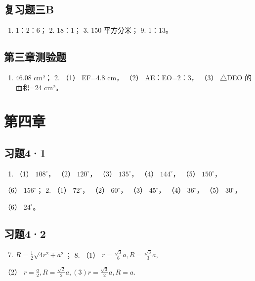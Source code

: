 \subsection{复习题三B}

\begin{enumerate}
\item
  1：2：6； 2. 18：1； 3. 150 平方分米； 9. 1：13。
\end{enumerate}

\subsection{第三章测验题}

\begin{enumerate}
\item
  46.08 cm²； 2. （1） EF=4.8 cm， （2） AE：EO=2：3， （3） △DEO
  的面积=24 cm²。
\end{enumerate}

\section{第四章}

\subsection{习题4·1}

\begin{enumerate}
\item
  （1） \(108^{\circ}\)， （2） \(120^{\circ}\)， （3）
  \(135^{\circ}\)， （4） \(144^{\circ}\)， （5） \(150^{\circ}\)，
\end{enumerate}

（6） \(156^{\circ}\)； 2. （1） \(72^{\circ}\)， （2） \(60^{\circ}\)，
（3） \(45^{\circ}\)， （4） \(36^{\circ}\)， （5） \(30^{\circ}\)，

（6） \(24^{\circ}\)。

\subsection{习题4·2}

\begin{enumerate}
\setcounter{enumi}{6}
\item
  \(R = \frac{1}{2}\sqrt{4r^2 + a^2}\)； 8. （1）
  \(r = \frac{\sqrt{3}}{6} a, R = \frac{\sqrt{3}}{3} a,\)
\end{enumerate}

（2）
\(r = \frac{a}{2}, R = \frac{\sqrt{2}}{2} a, (3) r = \frac{\sqrt{3}}{2} a, R = a.\)

